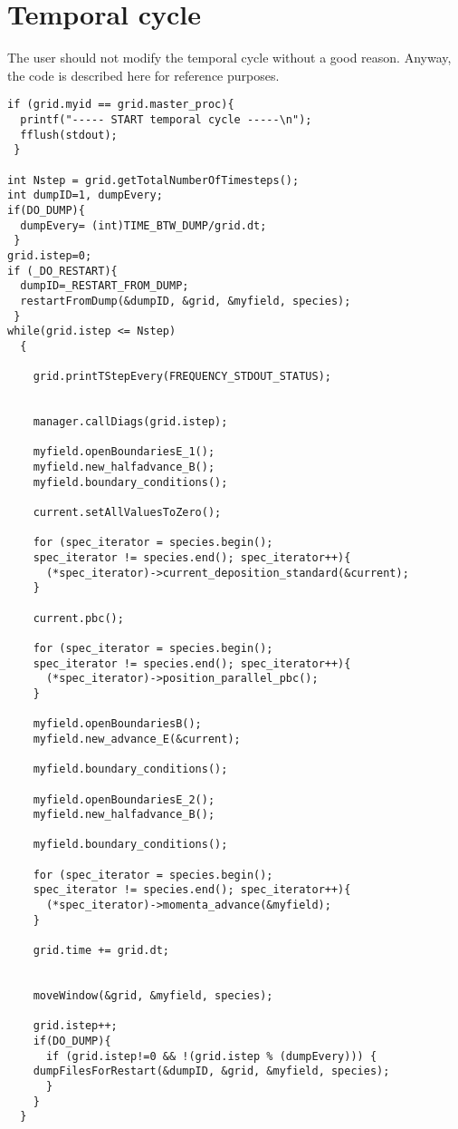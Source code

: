 \documentclass[11pt,a4paper]{report}
\begin{document}
\section{Temporal cycle}
The user should not modify the temporal cycle without a good reason. Anyway, the code is described here for reference purposes.
\begin{lstlisting}[backgroundcolor=\color{no_modify}]
if (grid.myid == grid.master_proc){
  printf("----- START temporal cycle -----\n");
  fflush(stdout);
 }

int Nstep = grid.getTotalNumberOfTimesteps();
int dumpID=1, dumpEvery;
if(DO_DUMP){
  dumpEvery= (int)TIME_BTW_DUMP/grid.dt;
 }
grid.istep=0;
if (_DO_RESTART){
  dumpID=_RESTART_FROM_DUMP;
  restartFromDump(&dumpID, &grid, &myfield, species);
 }
while(grid.istep <= Nstep)
  {

    grid.printTStepEvery(FREQUENCY_STDOUT_STATUS);


    manager.callDiags(grid.istep);

    myfield.openBoundariesE_1();
    myfield.new_halfadvance_B();
    myfield.boundary_conditions();

    current.setAllValuesToZero();

    for (spec_iterator = species.begin();
    spec_iterator != species.end(); spec_iterator++){
      (*spec_iterator)->current_deposition_standard(&current);
    }

    current.pbc();

    for (spec_iterator = species.begin();
    spec_iterator != species.end(); spec_iterator++){
      (*spec_iterator)->position_parallel_pbc();
    }

    myfield.openBoundariesB();
    myfield.new_advance_E(&current);

    myfield.boundary_conditions();

    myfield.openBoundariesE_2();
    myfield.new_halfadvance_B();

    myfield.boundary_conditions();

    for (spec_iterator = species.begin();
    spec_iterator != species.end(); spec_iterator++){
      (*spec_iterator)->momenta_advance(&myfield);
    }

    grid.time += grid.dt;


    moveWindow(&grid, &myfield, species);

    grid.istep++;
    if(DO_DUMP){
      if (grid.istep!=0 && !(grid.istep % (dumpEvery))) {
	dumpFilesForRestart(&dumpID, &grid, &myfield, species);
      }
    }
  }

\end{lstlisting}
\end{document}
